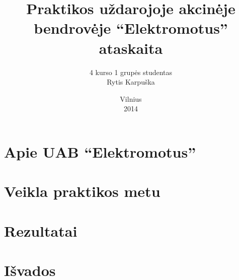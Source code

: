 \documentclass[12pt, a4paper, lithuanian, final]{article}
\title{Praktikos uždarojoje akcinėje bendrovėje "`Elektromotus"' ataskaita}
\author{
    4 kurso 1 grupės studentas \\
    Rytis Karpuška
}
\date{Vilnius \\
	2014}
\begin{document}
\maketitle


\section{Apie UAB "`Elektromotus"'}

\section{Veikla praktikos metu}

\section{Rezultatai}


\section{Išvados}
\end{document}
